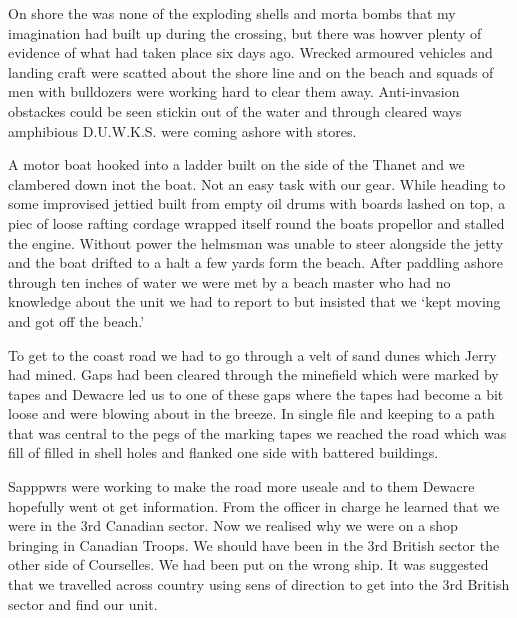 On shore the was none of the exploding shells and morta bombs that my
imagination had built up during the crossing, but there was howver
plenty of evidence of what had taken place six days ago. Wrecked
armoured vehicles and landing craft were scatted about the shore line
and on the beach and squads of men with bulldozers were working hard
to clear them away. Anti-invasion obstackes could be seen stickin out
of the water and through cleared ways amphibious D.U.W.K.S. were
coming ashore with stores.

A motor boat hooked into a ladder built on the side of the Thanet and
we clambered down inot the boat. Not an easy task with our gear. While
heading to some improvised jettied built from empty oil drums with
boards lashed on top, a piec of loose rafting cordage wrapped itself
round the boats propellor and stalled the engine. Without power the
helmsman was unable to steer alongside the jetty and the boat drifted
to a halt a few yards form the beach. After paddling ashore through
ten inches of water we were met by a beach master who had no knowledge
about the unit we had to report to but insisted that we `kept moving
and got off the beach.'

To get to the coast road we had to go through a velt of sand dunes
which Jerry had mined. Gaps had been cleared through the minefield
which were marked by tapes and \lieutenant Dewacre led us to one of these gaps
where the tapes had become a bit loose and were blowing about in the
breeze. In single file and keeping to a path that was central to the
pegs of the marking tapes we reached the road which was fill of filled
in shell holes and flanked one side with battered buildings.

Sapppwrs were working to make the road more useale and to them
\lieutenant Dewacre hopefully went ot get information. From the officer in
charge he learned that we were in the 3rd Canadian sector. Now we
realised why we were on a shop bringing in Canadian Troops. We should
have been in the 3rd British sector the other side of Courselles. We
had been put on the wrong ship. It was suggested that we travelled
across country using sens of direction to get into the 3rd British
sector and find our unit.


